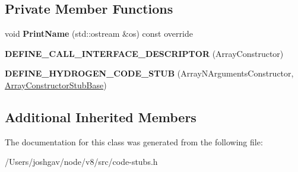 \subsection*{Private Member Functions}
\begin{DoxyCompactItemize}
\item 
void {\bfseries Print\+Name} (std\+::ostream \&os) const  override\hypertarget{classv8_1_1internal_1_1_array_n_arguments_constructor_stub_a2b9a491a83275fe6c2f1f046c618ea65}{}\label{classv8_1_1internal_1_1_array_n_arguments_constructor_stub_a2b9a491a83275fe6c2f1f046c618ea65}

\item 
{\bfseries D\+E\+F\+I\+N\+E\+\_\+\+C\+A\+L\+L\+\_\+\+I\+N\+T\+E\+R\+F\+A\+C\+E\+\_\+\+D\+E\+S\+C\+R\+I\+P\+T\+OR} (Array\+Constructor)\hypertarget{classv8_1_1internal_1_1_array_n_arguments_constructor_stub_a80b82e0f047f3d26b2c2c350d1abd05a}{}\label{classv8_1_1internal_1_1_array_n_arguments_constructor_stub_a80b82e0f047f3d26b2c2c350d1abd05a}

\item 
{\bfseries D\+E\+F\+I\+N\+E\+\_\+\+H\+Y\+D\+R\+O\+G\+E\+N\+\_\+\+C\+O\+D\+E\+\_\+\+S\+T\+UB} (Array\+N\+Arguments\+Constructor, \hyperlink{classv8_1_1internal_1_1_array_constructor_stub_base}{Array\+Constructor\+Stub\+Base})\hypertarget{classv8_1_1internal_1_1_array_n_arguments_constructor_stub_a9ec7e819074388045ab604bd98266d75}{}\label{classv8_1_1internal_1_1_array_n_arguments_constructor_stub_a9ec7e819074388045ab604bd98266d75}

\end{DoxyCompactItemize}
\subsection*{Additional Inherited Members}


The documentation for this class was generated from the following file\+:\begin{DoxyCompactItemize}
\item 
/\+Users/joshgav/node/v8/src/code-\/stubs.\+h\end{DoxyCompactItemize}
